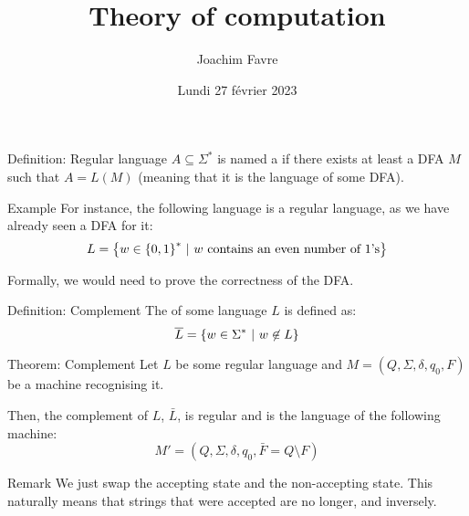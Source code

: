 \documentclass[a4paper]{article}
\title{Theory of computation}
\author{Joachim Favre}
\date{Lundi 27 février 2023}
\begin{document}
\maketitle


\begin{parag}{Definition: Regular language}
    $A \subseteq \Sigma^*$ is named a  if there exists at least a DFA $M$ such that $A = L\left(M\right)$ (meaning that it is the language of some DFA).

    \begin{subparag}{Example}
        For instance, the following language is a regular language, as we have already seen a DFA for it: 
        \[L = \left\{w \in \left\{0, 1\right\}^* \suchthat w \text{ contains an even number of 1's}\right\}\]

        Formally, we would need to prove the correctness of the DFA.
    \end{subparag}
\end{parag}

\begin{parag}{Definition: Complement}
    The  of some language $L$ is defined as: 
    \[\bar{L} = \left\{w \in \Sigma^* \suchthat w \not\in L\right\}\]
\end{parag}

\begin{parag}{Theorem: Complement}
    Let $L$ be some regular language and $M = \left(Q, \Sigma, \delta, q_0, F\right)$ be a machine recognising it.

    Then, the complement of $L$, $\bar{L}$, is regular and is the language of the following machine: 
    \[M' = \left(Q, \Sigma, \delta, q_0, \bar{F} = Q \setminus F\right)\]
    
    \begin{subparag}{Remark}
        We just swap the accepting state and the non-accepting state. This naturally means that strings that were accepted are no longer, and inversely.
    \end{subparag}
\end{parag}
\end{document}
